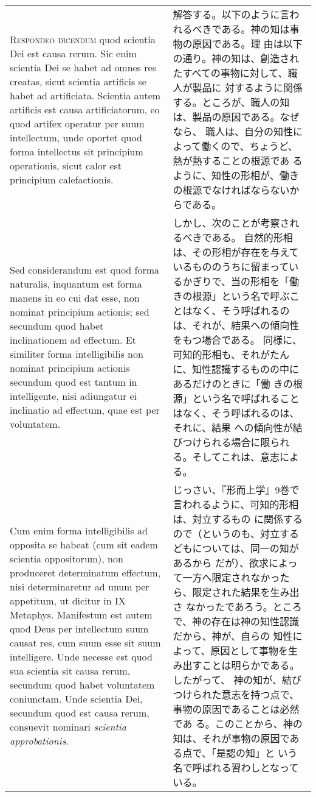 \documentclass[10pt]{jsarticle} %
\begin{document}
\begin{longtable}{p{21em}p{21em}}
{\scshape Respondeo dicendum} quod scientia Dei est causa rerum. Sic
enim scientia Dei se habet ad omnes res creatas, sicut scientia
artificis se habet ad artificiata. Scientia autem artificis est causa
artificiatorum, eo quod artifex operatur per suum intellectum, unde
oportet quod forma intellectus sit principium operationis, sicut calor
est principium calefactionis.


&

解答する。以下のように言われるべきである。神の知は事物の原因である。理
由は以下の通り。神の知は、創造されたすべての事物に対して、職人が製品に
対するように関係する。ところが、職人の知は、製品の原因である。なぜなら、
職人は、自分の知性によって働くので、ちょうど、熱が熱することの根源であ
るように、知性の形相が、働きの根源でなければならないからである。

\\



Sed considerandum est quod forma
naturalis, inquantum est forma manens in eo cui dat esse, non nominat
principium actionis; sed secundum quod habet inclinationem ad
effectum. Et similiter forma intelligibilis non nominat principium
actionis secundum quod est tantum in intelligente, nisi adiungatur ei
inclinatio ad effectum, quae est per voluntatem. 

&

しかし、次のことが考察されるべきである。
自然的形相は、その形相が存在を与えているもののうちに留まってい
るかぎりで、当の形相を「働きの根源」という名で呼ぶことはなく、そう呼ばれるの
 は、それが、結果への傾向性をもつ場合である。
同様に、可知的形相も、それがたんに、知性認識するものの中にあるだけのときに「働
 きの根源」という名で呼ばれることはなく、そう呼ばれるのは、それに、結果
 への傾向性が結びつけられる場合に限られる。そしてこれは、意志による。

\\

Cum enim forma
intelligibilis ad opposita se habeat (cum sit eadem scientia
oppositorum), non produceret determinatum effectum, nisi determinaretur
ad unum per appetitum, ut dicitur in IX Metaphys. Manifestum est autem
quod Deus per intellectum suum causat res, cum suum esse sit suum
intelligere. Unde necesse est quod sua scientia sit causa rerum,
secundum quod habet voluntatem coniunctam. Unde scientia Dei, secundum
quod est causa rerum, consuevit nominari {\itshape scientia approbationis}.

&

じっさい、『形而上学』9巻で言われるように、可知的形相は、対立するもの
に関係するので（というのも、対立するどもについては、同一の知があるから
だが）、欲求によって一方へ限定されなかったら、限定された結果を生み出さ
なかったであろう。ところで、神の存在は神の知性認識だから、神が、自らの
知性によって、原因として事物を生み出すことは明らかである。したがって、
神の知が、結びつけられた意志を持つ点で、事物の原因であることは必然であ
る。このことから、神の知は、それが事物の原因である点で、「是認の知」と
いう名で呼ばれる習わしとなっている。



\end{longtable}
\end{document}
